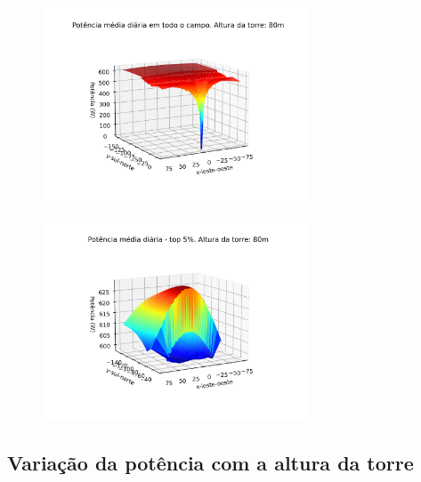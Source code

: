 \documentclass[12pt,notheorems,hyperref={pdfauthor=Professor Rafael Nardi}]{beamer}
\begin{document}
\begin{frame}%
	\begin{figure}[htpb]
		\centering
		\includegraphics[width=0.7\textwidth]{../../plots/tower_shadow_correction/square_grid_along_day_80mfull_grid.png}
		\label{fig:heliost_field_average_80m}
	\end{figure}
\end{frame}

\begin{frame}%
	\begin{figure}[htpb]
		\centering
		\includegraphics[width=0.7\textwidth]{../../plots/tower_shadow_correction/square_grid_along_day_80mtop_5_most_powerfull.png}
		\label{fig:heliost_field_average_80m}
	\end{figure}
\end{frame}

\subsection{Variação da potência com a altura da torre}
\end{document}
